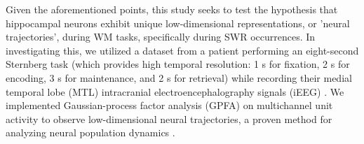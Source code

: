 \indent
Given the aforementioned points, this study seeks to test the hypothesis that hippocampal neurons exhibit unique low-dimensional representations, or 'neural trajectories', during WM tasks, specifically during SWR occurrences. In investigating this, we utilized a dataset from a patient performing an eight-second Sternberg task (which provides high temporal resolution: 1 s for fixation, 2 s for encoding, 3 s for maintenance, and 2 s for retrieval) while recording their medial temporal lobe (MTL) intracranial electroencephalography signals (iEEG) \cite{boran_dataset_2020}. We implemented Gaussian-process factor analysis (GPFA) on multichannel unit activity to observe low-dimensional neural trajectories, a proven method for analyzing neural population dynamics \cite{yu_gaussian-process_2009}.
\label{sec:introduction}